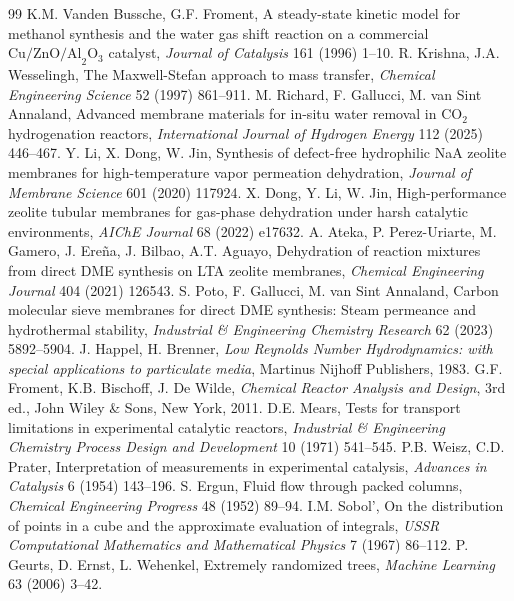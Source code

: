 \documentclass[12pt,a4paper]{article}
\begin{document}
\begin{thebibliography}{99}
 K.M. Vanden Bussche, G.F. Froment, A steady-state kinetic model for methanol synthesis and the water gas shift reaction on a commercial $\text{Cu/ZnO/Al}_2\text{O}_3$ catalyst, \textit{Journal of Catalysis} 161 (1996) 1--10.
 R. Krishna, J.A. Wesselingh, The Maxwell-Stefan approach to mass transfer, \textit{Chemical Engineering Science} 52 (1997) 861--911.
 M. Richard, F. Gallucci, M. van Sint Annaland, Advanced membrane materials for in-situ water removal in $\text{CO}_2$ hydrogenation reactors, \textit{International Journal of Hydrogen Energy} 112 (2025) 446--467.
 Y. Li, X. Dong, W. Jin, Synthesis of defect-free hydrophilic NaA zeolite membranes for high-temperature vapor permeation dehydration, \textit{Journal of Membrane Science} 601 (2020) 117924.
 X. Dong, Y. Li, W. Jin, High-performance zeolite tubular membranes for gas-phase dehydration under harsh catalytic environments, \textit{AIChE Journal} 68 (2022) e17632.
 A. Ateka, P. Perez-Uriarte, M. Gamero, J. Ere\~na, J. Bilbao, A.T. Aguayo, Dehydration of reaction mixtures from direct DME synthesis on LTA zeolite membranes, \textit{Chemical Engineering Journal} 404 (2021) 126543.
 S. Poto, F. Gallucci, M. van Sint Annaland, Carbon molecular sieve membranes for direct DME synthesis: Steam permeance and hydrothermal stability, \textit{Industrial \& Engineering Chemistry Research} 62 (2023) 5892--5904.
 J. Happel, H. Brenner, \textit{Low Reynolds Number Hydrodynamics: with special applications to particulate media}, Martinus Nijhoff Publishers, 1983.
 G.F. Froment, K.B. Bischoff, J. De Wilde, \textit{Chemical Reactor Analysis and Design}, 3rd ed., John Wiley \& Sons, New York, 2011.
 D.E. Mears, Tests for transport limitations in experimental catalytic reactors, \textit{Industrial \& Engineering Chemistry Process Design and Development} 10 (1971) 541--545.
 P.B. Weisz, C.D. Prater, Interpretation of measurements in experimental catalysis, \textit{Advances in Catalysis} 6 (1954) 143--196.
 S. Ergun, Fluid flow through packed columns, \textit{Chemical Engineering Progress} 48 (1952) 89--94.
 I.M. Sobol', On the distribution of points in a cube and the approximate evaluation of integrals, \textit{USSR Computational Mathematics and Mathematical Physics} 7 (1967) 86--112.
 P. Geurts, D. Ernst, L. Wehenkel, Extremely randomized trees, \textit{Machine Learning} 63 (2006) 3--42.
\end{thebibliography}
\end{document}
